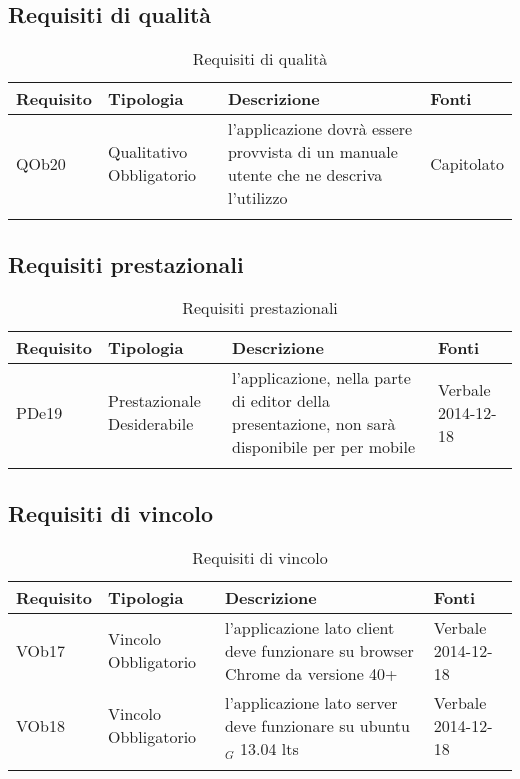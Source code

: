 \subsection{ Requisiti di qualità}
	
\begin{longtable}{|l|p{2.5cm}|p{5cm}|p{3.5cm}|}
\hline
\textbf{Requisito} & \textbf{Tipologia} & \textbf{Descrizione} & \textbf{Fonti} \\
\hline
QOb20 & Qualitativo \linebreak Obbligatorio & l'applicazione dovrà essere provvista di un manuale utente che ne descriva l'utilizzo & Capitolato \linebreak \\
\hline
\caption{Requisiti di qualità}
\end{longtable}
\subsection{ Requisiti prestazionali}
	
\begin{longtable}{|l|p{2.5cm}|p{5cm}|p{3.5cm}|}
\hline
\textbf{Requisito} & \textbf{Tipologia} & \textbf{Descrizione} & \textbf{Fonti} \\
\hline
PDe19 & Prestazionale \linebreak Desiderabile & l'applicazione, nella parte di editor della presentazione, non sarà disponibile per per mobile & Verbale 2014-12-18 \linebreak \\
\hline
\caption{Requisiti prestazionali}
\end{longtable}
\subsection{ Requisiti di vincolo}
	
\begin{longtable}{|l|p{2.5cm}|p{5cm}|p{3.5cm}|}
\hline
\textbf{Requisito} & \textbf{Tipologia} & \textbf{Descrizione} & \textbf{Fonti} \\
\hline
VOb17 & Vincolo \linebreak Obbligatorio & l'applicazione lato client deve funzionare su browser Chrome da versione 40+ & Verbale 2014-12-18 \linebreak \\
\hline
VOb18 & Vincolo \linebreak Obbligatorio & l'applicazione lato server deve funzionare su ubuntu$_G$ 13.04 lts & Verbale 2014-12-18 \linebreak \\
\hline
\caption{Requisiti di vincolo}
\end{longtable}
